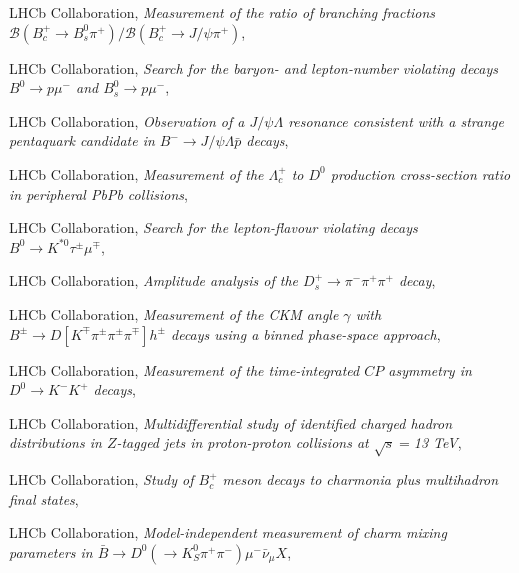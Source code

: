 \begin{cvcontent}
\begin{enumerate}[label={[\arabic*]}, leftmargin=1.5cm]
    \item LHCb Collaboration,
    \emph{Measurement of the ratio of branching fractions $\mathcal{B}(B_c^+ \to B_s^0 \pi^+)/\mathcal{B}(B_c^+ \to J/\psi \pi^+)$},
    \item LHCb Collaboration,
    \emph{Search for the baryon- and lepton-number violating decays $B^0\to p\mu^-$ and $B^0_s\to p\mu^-$},
    \item LHCb Collaboration,
    \emph{Observation of a $J/\psi\Lambda$ resonance consistent with a strange pentaquark candidate in $B^-\to J/\psi\Lambda\bar{p}$ decays},
    \item LHCb Collaboration,
    \emph{Measurement of the $\Lambda_c^+$ to $D^0$ production cross-section ratio in peripheral PbPb collisions},
    \sloppy
    \item LHCb Collaboration,
    \emph{Search for the lepton-flavour violating decays $B^0 \to K^{*0} \tau^\pm \mu^\mp$},
    \item LHCb Collaboration,
    \emph{Amplitude analysis of the $D_s^+ \to \pi^- \pi^+ \pi^+$ decay},
    \item LHCb Collaboration,
    \emph{Measurement of the CKM angle $\gamma$ with $ B^\pm \to D \left [ K^\mp \pi^\pm \pi^\pm \pi^\mp \right ] h^\pm$ decays using a binned phase-space approach},
    \item LHCb Collaboration,
    \emph{Measurement of the time-integrated $CP$ asymmetry in $D^0\to K^- K^+$ decays},
    \item LHCb Collaboration,
    \emph{Multidifferential study of identified charged hadron distributions in $Z$-tagged jets in proton-proton collisions at $\sqrt{s}=$13 TeV},
    \item LHCb Collaboration,
    \emph{Study of $B_c^+$ meson decays to charmonia plus multihadron final states},
    \item LHCb Collaboration,
    \emph{Model-independent measurement of charm mixing parameters in $\bar{B} \rightarrow D^0 ( \rightarrow K_S^0 \pi^+ \pi^-) \mu^- \bar{\nu}_\mu X$},

\end{enumerate}
\end{cvcontent}
